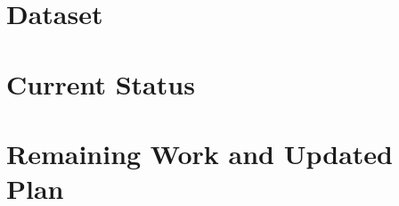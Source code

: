 \documentclass[10pt,journal,compsoc]{IEEEtran}
\begin{document}
\section{Dataset}\label{sec:data}


\section{Current Status}\label{sec:experiment}



\section{Remaining Work and Updated Plan}\label{sec:plan}








\end{document}
